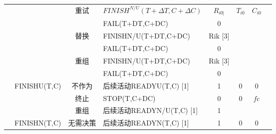 \begin{table}[htbp]
\begin{tabular}{rrrrrrrr}
        \multicolumn{1}{c|}{} 
        &       
        & \multicolumn{1}{|c}{\multirow{2}{*}{重试}} 
        & \multicolumn{1}{|l}{$FINISH^{N/U}(T+\Delta T,C+\Delta C)$} 
        & \multicolumn{1}{|c}{$R_{i0|}$} 
        & \multicolumn{1}{|c}{\multirow{2}{*}{$T_{i0}$}} 
        & \multicolumn{1}{|c}{\multirow{2}{*}{$C_{i0}$}} \\
        
        
        
        \multicolumn{1}{c}{} &       & \multicolumn{1}{c}{} & \multicolumn{1}{l}{FAIL(T+DT,C+DC)} & \multicolumn{1}{c}{0} & \multicolumn{1}{c}{} & \multicolumn{1}{c}{} \\
        \multicolumn{1}{c}{} &       & \multicolumn{1}{c}{\multirow{2}[4]{*}{替换}} & \multicolumn{1}{l}{FINISHN/U(T+DT,C+DC)} & \multicolumn{1}{c}{Rik  [3]} & \multicolumn{1}{c}{\multirow{2}[4]{*}{\textit{}}} & \multicolumn{1}{c}{\multirow{2}[4]{*}{\textit{}}} \\
        \multicolumn{1}{c}{} &       & \multicolumn{1}{c}{} & \multicolumn{1}{l}{FAIL(T+DT,C+DC)} & \multicolumn{1}{c}{0} & \multicolumn{1}{c}{} & \multicolumn{1}{c}{} \\
        \multicolumn{1}{c}{} &       & \multicolumn{1}{c}{\multirow{2}[4]{*}{重组}} & \multicolumn{1}{l}{FINISHN/U(T+DT,C+DC)} & \multicolumn{1}{c}{Rik  [3]} & \multirow{2}[4]{*}{\textit{}} & \multirow{2}[4]{*}{\textit{}} \\
        \multicolumn{1}{c}{} &       & \multicolumn{1}{c}{} & \multicolumn{1}{l}{FAIL(T+DT,C+DC)} & \multicolumn{1}{c}{0} &       &  \\
        \multicolumn{1}{c}{} & \multirow{3}[6]{*}{FINISHU(T,C)} & \multicolumn{1}{c}{不作为} & \multicolumn{1}{l}{后续活动READYU(T,C) [1]} & \multicolumn{1}{c}{1} & \multicolumn{1}{c}{0} & \multicolumn{1}{c}{0} \\
        \multicolumn{1}{c}{} &       & \multicolumn{1}{c}{终止} & \multicolumn{1}{l}{STOP(T,C+DC)} & \multicolumn{1}{c}{0} & \multicolumn{1}{c}{0} & \multicolumn{1}{c}{\textit{fc}} \\
        \multicolumn{1}{c}{} &       & \multicolumn{1}{c}{重组} & \multicolumn{1}{l}{后续活动READYN/U(T,C) [1]} & \multicolumn{1}{c}{1} &       & \textit{} \\
        \multicolumn{1}{c}{} & FINISHN(T,C) & \multicolumn{1}{c}{无需决策} & \multicolumn{1}{l}{后续活动READYN(T,C) [1]} & \multicolumn{1}{c}{1} & \multicolumn{1}{c}{0} & \multicolumn{1}{c}{0} \\
            \bottomrule
        \end{tabular}%
        \label{tab:addlabel}%
    \end{table}%
    

